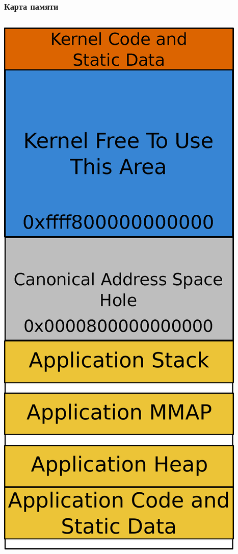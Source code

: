\begin{frame}
\end{frame}

\begin{frame}
\frametitle{Карта памяти}

\begin{columns}[T]

  \begin{column}{.4\textwidth}
    \includegraphics[width=.8\linewidth]{memmap}
  \end{column}


\end{columns}
\end{frame}

